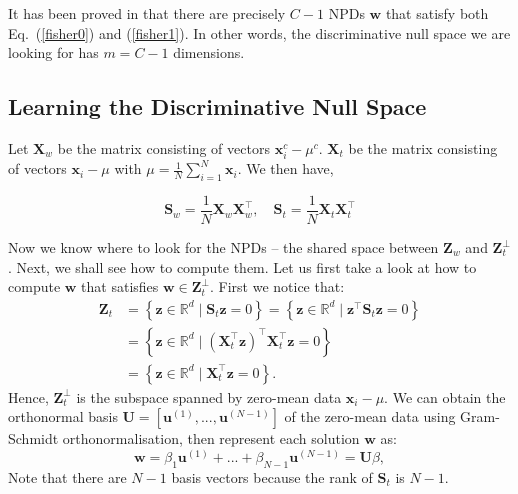\documentclass[10pt,twocolumn,letterpaper]{article}
\begin{document}
It has been proved in \cite{guo2006null} that there are precisely $C-1$ NPDs $\mathbf{w}$ that satisfy both Eq.~(\ref{fisher0}) and (\ref{fisher1}). In other words, the discriminative null space we are looking for has $m=C-1$ dimensions.  


\subsection{Learning the Discriminative Null Space}

Let $\mathbf{X}_{w}$ be the matrix consisting of vectors $\mathbf{x}_{i}^{c} - \mu^{c}$. $\mathbf{X}_{t}$ be the matrix consisting of vectors $\mathbf{x}_{i} - \mu$ with $\mu = \frac{1}{N}\sum^{N}_{i=1}\mathbf{x}_{i}$. We then have,

\begin{equation}\label{represen}
\mathbf{S}_{w} = \frac{1}{N} \mathbf{X}_{w} \mathbf{X}_{w}^{\top},\quad \mathbf{S}_{t} = \frac{1}{N} \mathbf{X}_{t} \mathbf{X}_{t}^{\top}
\end{equation}

Now we know where to look for the NPDs -- the shared space between $ \mathbf{Z}_{w}$ and $\mathbf{Z}_{t}^{\perp}$. Next, we shall see how to  compute them. Let us first take a look at how to compute $\mathbf{w} $ that satisfies $\mathbf{w}  \in \mathbf{Z}_{t}^{\perp}$. First we notice that:
\begin{align*}
\mathbf{Z}_{t} &=  \left \{  \mathbf{z}\in \mathbb{R}^{d}\mid \mathbf{S}_{t}\mathbf{z}=0\right \}  = \left \{\mathbf{z}\in \mathbb{R}^{d}\mid   \mathbf{z}^{\top}\mathbf{S}_{t}\mathbf{z} = 0 \right \} \\
&= \left \{\mathbf{z}\in \mathbb{R}^{d}\mid   (\mathbf{X}_{t}^{\top}\mathbf{z})^{\top}\mathbf{X}_{t}^{\top}\mathbf{z} = 0 \right \} \\
&=  \left \{  \mathbf{z}\in \mathbb{R}^{d}\mid \mathbf{X}_{t}^{\top}\mathbf{z}=0\right \}.
\end{align*} 
Hence, $\mathbf{Z}_{t}^{\perp}$ is the subspace spanned by zero-mean data $\mathbf{x}_{i} - \mu$. We can obtain the orthonormal basis $\mathbf{U} = [\mathbf{u}^{(1)},...,\mathbf{u}^{(N-1)}]$ of the zero-mean data using Gram-Schmidt orthonormalisation, then represent each solution $\mathbf{w}$ as:
\begin{equation}\label{basis} 
\mathbf{w} = \beta_{1}\mathbf{u}^{(1)}+...+\beta_{N-1}\mathbf{u}^{(N-1)}=\mathbf{U}\beta,
\end{equation}
Note that there are $N-1$ basis vectors because the rank of $\mathbf{S}_{t}$ is $N-1$.
\end{document}
